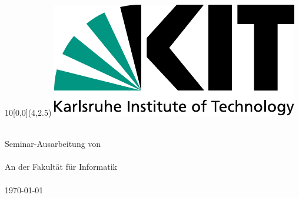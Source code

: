 
\newcommand{\diameter}{20}
\newcommand{\xone}{-15}
\newcommand{\xtwo}{160}
\newcommand{\yone}{15}
\newcommand{\ytwo}{-253}

\begin{titlepage}

\begin{textblock}{10}[0,0](4,2.5)
	\includegraphics[width=.3\textwidth]{images/KITLogo_RGB.pdf}
\end{textblock}
\vspace*{3.5cm}
\begin{center}
	\Huge{\mytitle}
	\vspace*{2cm}\\
	\Large{
		Seminar-Ausarbeitung von
	}\\
	\vspace*{1cm}
	\huge{\myname}\\
	\vspace*{1cm}
	\Large{
		An der Fakultät für Informatik
		\\
		\myinstitute
	}\\
	\vspace*{1cm}
	\Large{\today}
\end{center}
\vspace*{1cm}



\end{titlepage}
